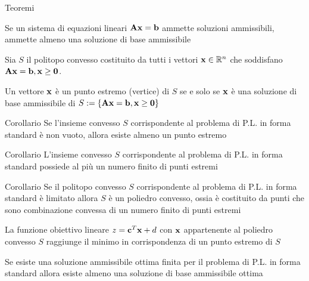\documentclass{beamer}
\begin{document}
\begin{frame}[allowframebreaks]{Teoremi}

\begin{theorem}
Se un sistema di equazioni lineari $\mathbf{A}\mathbf{x}  = \mathbf{b}$ ammette soluzioni ammissibili, ammette almeno una soluzione di base ammissibile
\end{theorem}

\begin{theorem}
   Sia $S$ il politopo convesso costituito da tutti i vettori $\mathbf{x} \in \mathbb{R}^n$  che soddisfano $\mathbf{A}\mathbf{x} = \mathbf{b}, \mathbf{x} \geq \mathbf{0}$.
   
   Un vettore $\mathbf{x}$ \`e un punto estremo (vertice) di $S$ se e solo se $\mathbf{x}$ \`e una soluzione di base ammissibile di 
   $S := \{\mathbf{A}\mathbf{x} = \mathbf{b}, \mathbf{x} \geq \mathbf{0}\}$
\end{theorem}

\framebreak

\begin{block}{Corollario}
Se l’insieme convesso $S$ corrispondente al problema di P.L. in forma standard \`e non vuoto, allora esiste almeno un punto estremo
\end{block}

\begin{block}{Corollario}
L’insieme convesso $S$ corrispondente al problema di P.L. in forma standard possiede al pi\`u un numero finito di punti estremi
\end{block}

\begin{block}{Corollario}
 Se il politopo convesso $S$ corrispondente al problema di P.L. in forma standard \`e limitato allora $S$ \`e un poliedro convesso, ossia \`e costituito da punti che sono combinazione convessa di un numero finito di punti estremi
\end{block}

\framebreak

\begin{theorem}
  La funzione obiettivo lineare $z = \mathbf{c}^T\mathbf{x} + d$ con $\mathbf{x}$ appartenente al poliedro convesso $S$ raggiunge il minimo in corrispondenza di un punto estremo di $S$
\end{theorem}

\begin{theorem}
    Se esiste una soluzione ammissibile ottima finita per il problema di P.L. in forma standard allora esiste almeno una soluzione di base ammissibile ottima
\end{theorem}

\end{frame}
\end{document}
